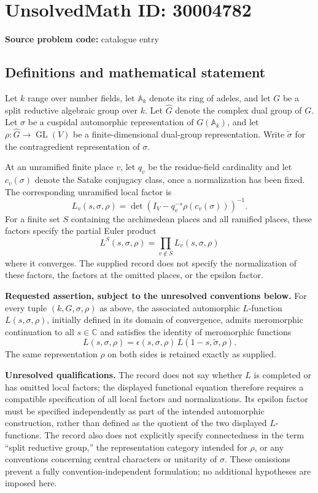 \documentclass[11pt]{article}
\newcommand{\C}{\mathbb{C}}
\begin{document}
\section*{UnsolvedMath ID: 30004782}
\textbf{Source problem code:} catalogue entry
\subsection{Definitions and mathematical statement}
Let \(k\) range over number fields, let \(\mathbb A_k\) denote its ring of adeles, and let \(G\) be a split reductive algebraic group over \(k\). Let \(\widehat G\) denote the complex dual group of \(G\). Let \(\sigma\) be a cuspidal automorphic representation of \(G(\mathbb A_k)\), and let \(\rho\colon\widehat G\to\operatorname{GL}(V)\) be a finite-dimensional dual-group representation. Write \(\widetilde\sigma\) for the contragredient representation of \(\sigma\).

At an unramified finite place \(v\), let \(q_v\) be the residue-field cardinality and let \(c_v(\sigma)\) denote the Satake conjugacy class, once a normalization has been fixed. The corresponding unramified local factor is
\[
L_v(s,\sigma,\rho)=\det\!\left(I_V-q_v^{-s}\rho(c_v(\sigma))\right)^{-1}.
\]
For a finite set \(S\) containing the archimedean places and all ramified places, these factors specify the partial Euler product
\[
L^S(s,\sigma,\rho)=\prod_{v\notin S}L_v(s,\sigma,\rho)
\]
where it converges. The supplied record does not specify the normalization of these factors, the factors at the omitted places, or the epsilon factor.

\textbf{Requested assertion, subject to the unresolved conventions below.} For every tuple \((k,G,\sigma,\rho)\) as above, the associated automorphic \(L\)-function \(L(s,\sigma,\rho)\), initially defined in its domain of convergence, admits meromorphic continuation to all \(s\in\C\) and satisfies the identity of meromorphic functions
\[
L(s,\sigma,\rho)=\epsilon(s,\sigma,\rho)\,L(1-s,\widetilde\sigma,\rho).
\]
The same representation \(\rho\) on both sides is retained exactly as supplied.

\textbf{Unresolved qualifications.} The record does not say whether \(L\) is completed or has omitted local factors; the displayed functional equation therefore requires a compatible specification of all local factors and normalizations. Its epsilon factor must be specified independently as part of the intended automorphic construction, rather than defined as the quotient of the two displayed \(L\)-functions. The record also does not explicitly specify connectedness in the term ``split reductive group,'' the representation category intended for \(\rho\), or any conventions concerning central characters or unitarity of \(\sigma\). These omissions prevent a fully convention-independent formulation; no additional hypotheses are imposed here.
\end{document}

